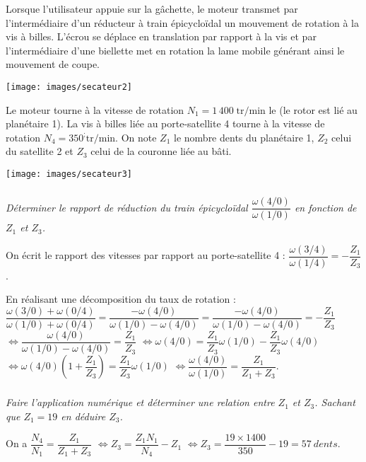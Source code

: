 \documentclass[10pt,fleqn]{article} %
\begin{document}
\begin{multicols}{2}
\begin{multicols}{2}
Lorsque l’utilisateur appuie sur la gâchette, le moteur transmet par l’intermédiaire d’un réducteur à train épicycloïdal un mouvement de rotation à la vis à billes. L’écrou se déplace en translation par rapport à la vis et par l’intermédiaire d’une biellette met en rotation la lame mobile générant ainsi le mouvement de coupe. 

\begin{center}
 \texttt{[image: images/secateur2]}
\end{center}




Le moteur tourne à la vitesse de rotation $N_1=1\,400\;\text{tr/min}$ le (le rotor est lié au planétaire 1). La vis à billes liée au porte-satellite 4 tourne à la vitesse de rotation $N_4=350^; \text{tr/min}$. On note $Z_1$ le nombre dents du planétaire 1, $Z_2$ celui du satellite 2 et $Z_3$ celui de la couronne liée au bâti.

\begin{center}
 \texttt{[image: images/secateur3]}
\end{center}

\fi

\subparagraph{}
\textit{Déterminer le rapport de réduction du train épicycloïdal $\dfrac{\omega(4/0)}{\omega(1/0)}$ en fonction de $Z_1$ et $Z_3$.}
 \ifprof
 \begin{corrige}
 On écrit le rapport des vitesses par rapport au porte-satellite 4 : $\dfrac{\omega(3/4)}{\omega(1/4)} = - \dfrac{Z_1}{Z_3}$.
 
 En réalisant une décomposition du taux de rotation : $\dfrac{\omega(3/0)+\omega(0/4)}{\omega(1/0)+\omega(0/4)} = \dfrac{-\omega(4/0)}{\omega(1/0)-\omega(4/0)}= \dfrac{-\omega(4/0)}{\omega(1/0)-\omega(4/0)} =- \dfrac{Z_1}{Z_3}$ $\Leftrightarrow \dfrac{\omega(4/0)}{\omega(1/0)-\omega(4/0)} = \dfrac{Z_1}{Z_3} $
 $\Leftrightarrow {\omega(4/0)} = \dfrac{Z_1}{Z_3} \omega(1/0)-\dfrac{Z_1}{Z_3} \omega(4/0)$
 $\Leftrightarrow {\omega(4/0)} \left(1+\dfrac{Z_1}{Z_3} \right)= \dfrac{Z_1}{Z_3} \omega(1/0)$
 $\Leftrightarrow \dfrac{\omega(4/0)}{\omega(1/0)}=  \dfrac{Z_1}{Z_1+Z_3} $.
 \end{corrige}
 \else
 \fi
 
\subparagraph{}
\textit{Faire l’application numérique et déterminer une relation entre $Z_1$ et $Z_3$. Sachant que $Z_1=19$ en déduire $Z_3$.}
 \ifprof
 \begin{corrige}
 On a $\dfrac{N_4}{N_1}=\dfrac{Z_1}{Z_1+Z_3} $ $\Leftrightarrow Z_3=\dfrac{Z_1 N_1}{N_4} -  Z_1 $ 
 $\Leftrightarrow Z_3=\dfrac{19 \times 1400}{350} -  19 = \SI{57}{dents}$.
 \end{corrige}
 \else
 \fi
 

\end{multicols}
\end{multicols}
\end{document}
